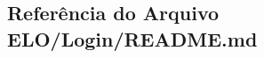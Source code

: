 \hypertarget{ELO_2Login_2README_8md}{}\subsection{Referência do Arquivo E\+L\+O/\+Login/\+R\+E\+A\+D\+M\+E.md}
\label{ELO_2Login_2README_8md}

